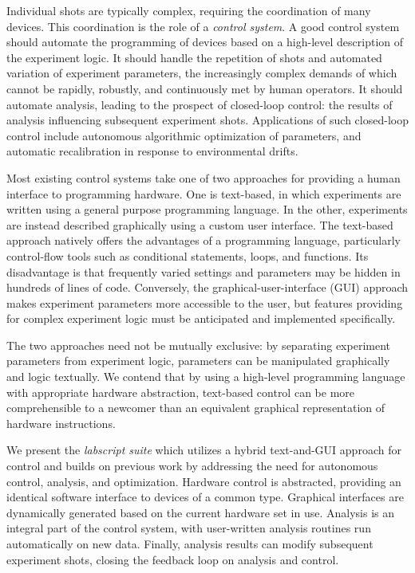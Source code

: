 Individual shots are typically complex, requiring the coordination of many devices.
This coordination is the role of a \textit{control system}.
A good control system should automate the programming of devices based on a high-level description of the experiment logic\cite{varoquaux_agile_2008}.
It should handle the repetition of shots and automated variation of experiment parameters, the increasingly complex demands of which cannot be rapidly, robustly, and continuously met by human operators.
It should automate analysis, leading to the prospect of closed-loop control: the results of analysis influencing subsequent experiment shots.
Applications of such closed-loop control include autonomous algorithmic optimization of parameters, and automatic recalibration in response to environmental drifts.

Most existing control systems take one of two approaches for providing a human interface to programming hardware.
One is text-based, in which experiments are written using a general purpose programming language\cite{gaskell_open-source_2009}.
In the other, experiments are instead described graphically using a custom user interface\cite{anderson_nonequilibrium_2010,beeler_matthew_disordered_2011,altin_role_2012,stoferle_exploring_2005,keshet_distributed_2013}.
The text-based approach natively offers the advantages of a programming language, particularly control-flow tools such as conditional statements, loops, and functions.
Its disadvantage is that frequently varied settings and parameters may be hidden in hundreds of lines of code.
Conversely, the graphical-user-interface (GUI) approach makes experiment parameters more accessible to the user, but features providing for complex experiment logic must be anticipated and implemented specifically\cite{keshet_distributed_2013,stoferle_exploring_2005}.

The two approaches need not be mutually exclusive: by separating experiment parameters from experiment logic, parameters can be manipulated graphically and logic textually\cite{owen_fast_2004,meyrath_laboratory_2012}.
We contend that by using a high-level programming language with appropriate hardware abstraction, text-based control can be more comprehensible to a newcomer than an equivalent graphical representation of hardware instructions.

We present the \textit{labscript suite} which utilizes a hybrid text-and-GUI approach for control and builds on previous work by addressing the need for autonomous control, analysis, and optimization.
Hardware control is abstracted, providing an identical software interface to devices of a common type.
Graphical interfaces are dynamically generated based on the current hardware set in use.
Analysis is an integral part of the control system, with user-written analysis routines run automatically on new data.
Finally, analysis results can modify subsequent experiment shots, closing the feedback loop on analysis and control.

